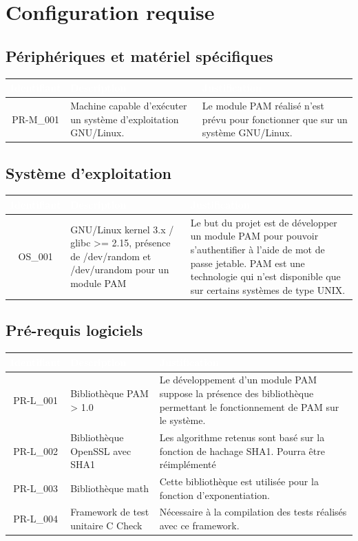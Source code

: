\documentclass{"../../res/univ-projet"}
\begin{document}
\section{Configuration requise}

\subsection{Périphériques et matériel spécifiques}
\begin{tabular}{|c|p{}|p{}|}
\hline
\rowcolor{gray}
\textcolor{white}{\bfseries Identifiant} & 
\textcolor{white}{\bfseries Description} &
\textcolor{white}{\bfseries Justification} \\
\hline
PR-M\_001 &
Machine capable d'exécuter un système d'exploitation GNU/Linux. & 
Le module PAM réalisé n'est prévu pour fonctionner que sur un système GNU/Linux. \\
\hline
\end{tabular}

\subsection{Système d'exploitation}
\begin{tabular}{|c|p{}|p{}|}
\hline
\rowcolor{gray}
\textcolor{white}{\bfseries Identifiant} & 
\textcolor{white}{\bfseries Description} &
\textcolor{white}{\bfseries Justification} \\
\hline
OS\_001& 
GNU/Linux kernel 3.x / glibc >= 2.15, présence de /dev/random et /dev/urandom 
pour un module PAM &
Le but du projet est de développer un module PAM pour pouvoir s'authentifier
à l'aide de mot de passe jetable. PAM est une technologie qui n'est disponible
que sur certains systèmes de type UNIX.\\
\hline
\end{tabular}

\subsection{Pré-requis logiciels}
\begin{tabular}{|c|p{}|p{}|}
\hline
\rowcolor{gray}
\textcolor{white}{\bfseries Identifiant} & 
\textcolor{white}{\bfseries Description} &
\textcolor{white}{\bfseries Justification} \\
\hline
PR-L\_001 &
Bibliothèque PAM > 1.0 &
Le développement d'un module PAM suppose la présence des bibliothèque permettant
le fonctionnement de PAM sur le système. \\
\hline
PR-L\_002 &
Bibliothèque OpenSSL avec SHA1 &
Les algorithme retenus sont basé sur la fonction de hachage SHA1. Pourra être réimplémenté \\
\hline
PR-L\_003 &
Bibliothèque math &
Cette bibliothèque est utilisée pour la fonction d'exponentiation. \\
\hline
PR-L\_004 &
Framework de test unitaire C Check &
Nécessaire à la compilation des tests réalisés avec ce framework.\\
\hline
\end{tabular}
\end{document}
